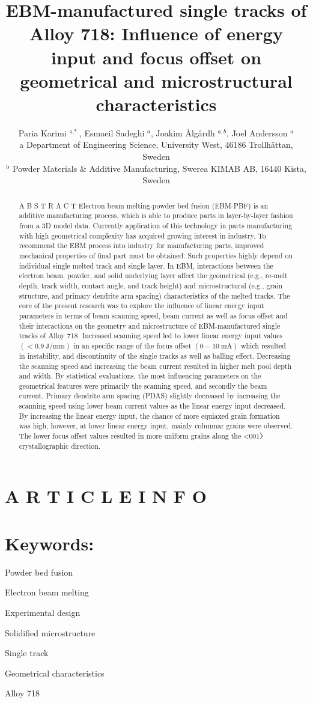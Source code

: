 \documentclass[10pt]{article}
\title{EBM-manufactured single tracks of Alloy 718: Influence of energy input and focus offset on geometrical and microstructural characteristics }
\author{Paria Karimi ${ }^{\text {a,* }}$, Esmaeil Sadeghi ${ }^{a}$, Joakim Ålgårdh ${ }^{a, b}$, Joel Andersson ${ }^{a}$\\
a Department of Engineering Science, University West, 46186 Trollhättan, Sweden\\
${ }^{\mathrm{b}}$ Powder Materials \& Additive Manufacturing, Swerea KIMAB AB, 16440 Kista, Sweden}
\date{}
\begin{document}
\maketitle


\section*{A R T I C L E I N F O}
\section*{Keywords:}
Powder bed fusion

Electron beam melting

Experimental design

Solidified microstructure

Single track

Geometrical characteristics

Alloy 718

\begin{abstract}
A B S T R A C T Electron beam melting-powder bed fusion (EBM-PBF) is an additive manufacturing process, which is able to produce parts in layer-by-layer fashion from a 3D model data. Currently application of this technology in parts manufacturing with high geometrical complexity has acquired growing interest in industry. To recommend the EBM process into industry for manufacturing parts, improved mechanical properties of final part must be obtained. Such properties highly depend on individual single melted track and single layer. In EBM, interactions between the electron beam, powder, and solid underlying layer affect the geometrical (e.g., re-melt depth, track width, contact angle, and track height) and microstructural (e.g., grain structure, and primary dendrite arm spacing) characteristics of the melted tracks. The core of the present research was to explore the influence of linear energy input parameters in terms of beam scanning speed, beam current as well as focus offset and their interactions on the geometry and microstructure of EBM-manufactured single tracks of Alloy 718. Increased scanning speed led to lower linear energy input values $(<0.9 \mathrm{~J} / \mathrm{mm})$ in an specific range of the focus offset $(0-10 \mathrm{~mA})$ which resulted in instability, and discontinuity of the single tracks as well as balling effect. Decreasing the scanning speed and increasing the beam current resulted in higher melt pool depth and width. By statistical evaluations, the most influencing parameters on the geometrical features were primarily the scanning speed, and secondly the beam current. Primary dendrite arm spacing (PDAS) slightly decreased by increasing the scanning speed using lower beam current values as the linear energy input decreased. By increasing the linear energy input, the chance of more equiaxed grain formation was high, however, at lower linear energy input, mainly columnar grains were observed. The lower focus offset values resulted in more uniform grains along the <001〉 crystallographic direction.
\end{abstract}
\end{document}
